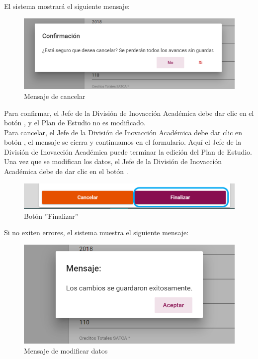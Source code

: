 El sistema mostrará el siguiente mensaje:
\begin{figure}[H]
	\centering
	\hypertarget{ms1}{\includegraphics[width=0.7\linewidth]{images/SP4-GPE/m1}}
	\caption{Mensaje de cancelar}
	\label{ms1}
\end{figure}

Para confirmar, el Jefe de la División de Inovacción Académica debe dar clic en el botón  , y el Plan de Estudio no es modificado.\\

Para cancelar, el Jefe de la División de Inovacción Académica debe dar clic en botón  , el mensaje se cierra y continuamos en el formulario. Aquí el Jefe de la División de Inovacción Académica puede terminar la edición del Plan de Estudio.\\

Una vez que se modifican los datos,  el Jefe de la División de Inovacción Académica debe de dar clic en el botón  .
\begin{figure}[H]
	\centering
	\hypertarget{btnfin}{\includegraphics[width=0.7\linewidth]{images/SP4-GPE/editarPER}}
	\caption{Botón ''Finalizar''}
	\label{btnfin}
\end{figure}

Si no exiten errores, el sistema muestra el siguiente mensaje:
\begin{figure}[H]
	\centering
	\hypertarget{ms2}{\includegraphics[width=0.7\linewidth]{images/SP4-GPE/m2}}
	\caption{Mensaje de modificar datos}
	\label{ms2}
\end{figure}


